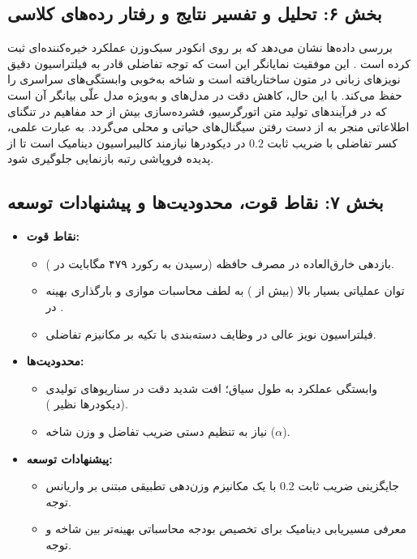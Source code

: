 \subsection*{بخش ۶: تحلیل و تفسیر نتایج و رفتار رده‌های کلاسی }
بررسی داده‌ها نشان می‌دهد که  بر روی انکودر سبک‌وزن  عملکرد خیره‌کننده‌ای ثبت کرده است . این موفقیت نمایانگر این است که توجه تفاضلی قادر به فیلتراسیون دقیق نویزهای زبانی در متون ساختاریافته است و شاخه  به‌خوبی وابستگی‌های سراسری را حفظ می‌کند. 
با این حال، کاهش دقت در مدل‌های  و به‌ویژه مدل علّی   بیانگر آن است که در فرآیندهای تولید متن اتورگرسیو، فشرده‌سازی بیش از حد مفاهیم در تنگنای اطلاعاتی منجر به از دست رفتن سیگنال‌های حیاتی و محلی  می‌گردد. به عبارت علمی، کسر تفاضلی با ضریب ثابت $0.2$ در دیکودرها نیازمند کالیبراسیون دینامیک است تا از پدیده فروپاشی رتبه بازنمایی  جلوگیری شود.

\subsection*{بخش ۷: نقاط قوت، محدودیت‌ها و پیشنهادات توسعه }
\begin{itemize}
    \item \textbf{نقاط قوت:}
    \begin{itemize}
        \item بازدهی خارق‌العاده در مصرف حافظه  (رسیدن به رکورد ۴۷۹ مگابایت در ).
        \item توان عملیاتی بسیار بالا (بیش از ) به لطف محاسبات موازی و بارگذاری بهینه در .
        \item فیلتراسیون نویز عالی در وظایف دسته‌بندی  با تکیه بر مکانیزم تفاضلی.
    \end{itemize}
    \item \textbf{محدودیت‌ها:}
    \begin{itemize}
        \item وابستگی عملکرد به طول سیاق؛ افت شدید دقت در سناریوهای تولیدی (دیکودرها نظیر ).
        \item نیاز به تنظیم دستی ضریب تفاضل و وزن شاخه  ($\alpha$).
    \end{itemize}
    \item \textbf{پیشنهادات توسعه:}
    \begin{itemize}
        \item جایگزینی ضریب ثابت $0.2$ با یک مکانیزم وزن‌دهی تطبیقی مبتنی بر واریانس توجه.
        \item معرفی مسیریابی دینامیک  برای تخصیص بودجه محاسباتی بهینه‌تر بین شاخه  و توجه.
    \end{itemize}
\end{itemize}

